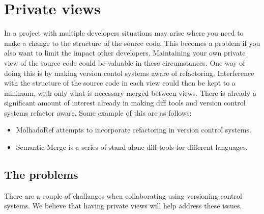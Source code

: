 
\chapter{Private views}

In a project with multiple developers situations may arise where you need to make a change to the structure of the source code. This becomes a problem if you also want to limit the impact other developers.  Maintaining your own private view of the source code could be valuable in these circumstances. One way of doing this is by making version contol systems aware of refactoring.  Interference with the structure of the source code in each view could then be kept to a minimum, with only what is necessary merged between views. There is already a significant amount of interest already in making diff tools and version control systems refactor aware. Some example of this are as follows:

\begin{itemize}
  \item MolhadoRef \cite{DannyDig} \cite{Dig2008} attempts to incorporate refactoring in version control systems.
  \item Semantic Merge is a series of stand alone diff tools for different languages. 
\end{itemize}

\section{The problems}
There are a couple of challanges when collaborating using versioning control systems. We believe that having private views will help address these issues.  

